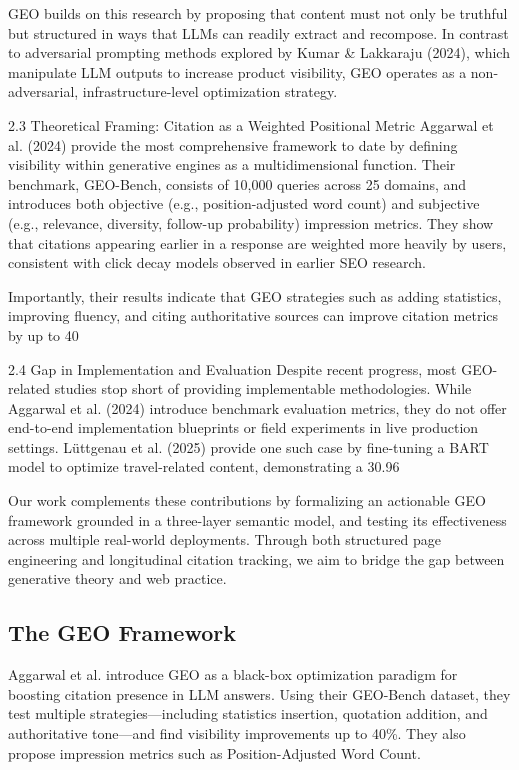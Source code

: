 GEO builds on this research by proposing that content must not only be truthful but structured in ways that LLMs can readily extract and recompose. In contrast to adversarial prompting methods explored by Kumar & Lakkaraju (2024), which manipulate LLM outputs to increase product visibility, GEO operates as a non-adversarial, infrastructure-level optimization strategy.

2.3 Theoretical Framing: Citation as a Weighted Positional Metric
Aggarwal et al. (2024) provide the most comprehensive framework to date by defining visibility within generative engines as a multidimensional function. Their benchmark, GEO-Bench, consists of 10,000 queries across 25 domains, and introduces both objective (e.g., position-adjusted word count) and subjective (e.g., relevance, diversity, follow-up probability) impression metrics. They show that citations appearing earlier in a response are weighted more heavily by users, consistent with click decay models observed in earlier SEO research.

Importantly, their results indicate that GEO strategies such as adding statistics, improving fluency, and citing authoritative sources can improve citation metrics by up to 40%

2.4 Gap in Implementation and Evaluation
Despite recent progress, most GEO-related studies stop short of providing implementable methodologies. While Aggarwal et al. (2024) introduce benchmark evaluation metrics, they do not offer end-to-end implementation blueprints or field experiments in live production settings. Lüttgenau et al. (2025) provide one such case by fine-tuning a BART model to optimize travel-related content, demonstrating a 30.96%

Our work complements these contributions by formalizing an actionable GEO framework grounded in a three-layer semantic model, and testing its effectiveness across multiple real-world deployments. Through both structured page engineering and longitudinal citation tracking, we aim to bridge the gap between generative theory and web practice.

\subsection{The GEO Framework}

Aggarwal et al. \cite{aggarwal2024geo} introduce GEO as a black-box optimization paradigm for boosting citation presence in LLM answers. Using their GEO-Bench dataset, they test multiple strategies---including statistics insertion, quotation addition, and authoritative tone---and find visibility improvements up to 40\%. They also propose impression metrics such as Position-Adjusted Word Count.

